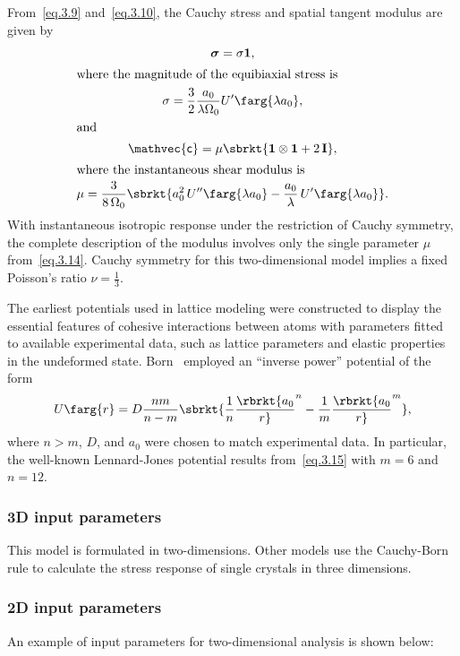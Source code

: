 From~\eqref{eq.3.9} 
and~\eqref{eq.3.10}, the Cauchy stress and spatial tangent modulus are given by
\begin{gather}
\boldsymbol{\sigma} =  \sigma \mathbf{1}, \\
\intertext{where the magnitude of the equibiaxial stress is}
\sigma = {3 \over 2}{a_0 \over \lambda \Omega_0} U'\farg{\lambda a_0}, \\
\intertext{and}
\mathvec{\mathsf{c}} = \mu \sbrkt{\mathbf{1} \otimes \mathbf{1} + 2\, \mathbf{I}}, \\
\intertext{where the instantaneous shear modulus is}
\mu = {3 \over 8\,\Omega_0}
   \sbrkt{a_0^2\,U''\farg{\lambda a_0} - 
        {a_0 \over \lambda}\,U'\farg{\lambda a_0}}.
   \label{eq.3.14}
\end{gather}
With instantaneous isotropic response under the restriction of Cauchy symmetry, 
the complete description of the modulus involves only the 
single parameter $\mu$ from~\eqref{eq.3.14}. Cauchy symmetry for this
two-dimensional model implies a fixed Poisson's ratio
$\nu = \frac{1}{3}$.

The earliest potentials used in lattice modeling were constructed to display the
essential features of cohesive interactions between atoms with parameters fitted to
available experimental data, such as lattice parameters and elastic properties
in the undeformed state. Born~\cite{Born1940} employed an ``inverse power'' 
potential of the form
\begin{equation}
\label{eq.3.15}
U\farg{r} = D {nm \over {n - m}}
  \sbrkt{{1 \over n}\rbrkt{a_0 \over r}^n - {1 \over m}\rbrkt{a_0 \over r}^m},
\end{equation}
where $n > m$, $D$, and $a_0$ were chosen to match experimental data. In particular, 
the well-known Lennard-Jones potential results from~\eqref{eq.3.15} with 
$m = 6$ and $n = 12$.

\subsubsection{3D input parameters}
This model is formulated in two-dimensions. Other models use the
Cauchy-Born rule to calculate the stress response of single crystals
in three dimensions.

\subsubsection{2D input parameters}
An example of input parameters for two-dimensional analysis is shown 
below:

